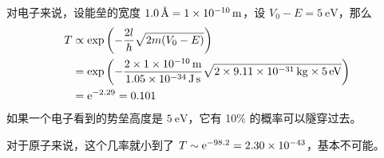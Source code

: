 对电子来说，设能垒的宽度 $\SI{1.0}{\angstrom} = \SI{1E-10}{\metre}$，设 $V_0 - E = \SI{5}{\electronvolt}$，那么
\begin{align}
    T &\propto \exp\left(-\frac{2l}{\hbar} \sqrt{2m(V_0 - E)}\right) \\
    &= \exp\left(
        - \frac{2\times\SI{1E-10}{\metre}}{\SI{1.05E-34}{\joule\second}}
        \sqrt{2\times\SI{9.11E-31}{\kilo\gram}\times\SI{5}{\electronvolt}}
    \right)
    \\ & = \mathrm{e}^{-2.29} = 0.101
\end{align}
如果一个电子看到的势垒高度是 $\SI{5}{\electronvolt}$，它有 10\% 的概率可以隧穿过去。

对于原子来说，这个几率就小到了 $T\sim \mathrm{e}^{-98.2} = \num{2.30E-43}$，基本不可能。


